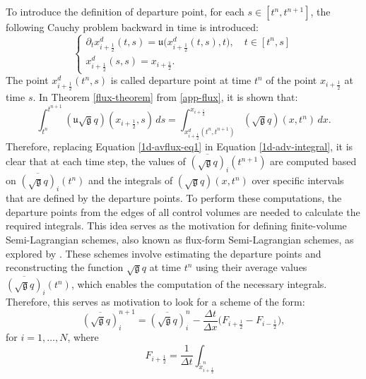 \documentclass[preprint,12pt]{elsarticle}
\begin{document}
\begin{linenumbers}
To introduce the definition of departure point, for each $s \in [t^n,t^{n+1}]$,
the following Cauchy problem backward in time is introduced:
\begin{equation}
	\label{1d-dp-equation}
	\begin{cases}
		{\partial_t} x_{i+\frac{1}{2}}^d(t,s) = \mathfrak{u}\big(  x_{i+\frac{1}{2}}^d(t,s),t\big),\quad t\in[t^{n},s] \\
		x_{i+\frac{1}{2}}^d(s,s) = x_{i+\frac{1}{2}}.
	\end{cases}
\end{equation}
The point $ x_{i+\frac{1}{2}}^d(t^n,s)$ is called departure point at time $t^n$
of the point $x_{i+\frac{1}{2}}$ at time $s$.
In Theorem \ref{flux-theorem} from \ref{app-flux}, it is shown that:
\begin{equation}
	\label{1d-avflux-eq1}
	\int_{t^n}^{t^{n+1}} (\mathfrak{u}\sqrt{\mathfrak{g}}q)(x_{i+\frac{1}{2}}, s) \,ds = 
	\int^{x_{i+\frac{1}{2}}}_{ x_{i+\frac{1}{2}}^d(t^n,t^{n+1})} (\sqrt{\mathfrak{g}}q)(x,t^n)\,dx.
\end{equation}
Therefore, replacing Equation \eqref{1d-avflux-eq1} in Equation \eqref{1d-adv-integral},
it is clear that at each time step, the values of $\overline{(\mathfrak{\sqrt{g}}q)}_{i}(t^{n+1})$ are computed based on $\overline{(\mathfrak{\sqrt{g}}q)}_{i}(t^{n})$  and the integrals 
of ${(\mathfrak{\sqrt{g}}q)}(x,t^n)$ over specific intervals that are defined by the departure points.
To perform these computations, the departure points from the edges of all control volumes are needed to calculate the required integrals.
This idea serves as the motivation for defining finite-volume Semi-Lagrangian schemes, also known as flux-form Semi-Lagrangian schemes, as explored by \cite{lin:1996}.
These schemes involve estimating the departure points and reconstructing the function ${\mathfrak{\sqrt{g}}q}$ at time $t^n$ using their average values $\overline{(\mathfrak{\sqrt{g}}q)}_{i}(t^n)$, which enables the computation of the necessary integrals.
Therefore, this serves as motivation to look for a scheme of the form:
\begin{equation}
	\label{fv-scheme}
	\overline{(\sqrt{\mathfrak{g}}q)}^{n+1}_{i} = \overline{(\sqrt{\mathfrak{g}}q)}^{n}_{i} - \frac{\Delta t}{\Delta x}
	\bigg({F}_{i+\frac{1}{2}}-{F}_{i-\frac{1}{2}}\bigg),
\end{equation}
for $i=1,\ldots,N$,
where 
\begin{equation}
	\label{numerical-flux}
	{F}_{i+\frac{1}{2}} =
	 \frac{1}{\Delta t}\int_{\tilde{x}_{i+\frac{1}{2}}^n}

\end{equation}
\end{linenumbers}
\end{document}
